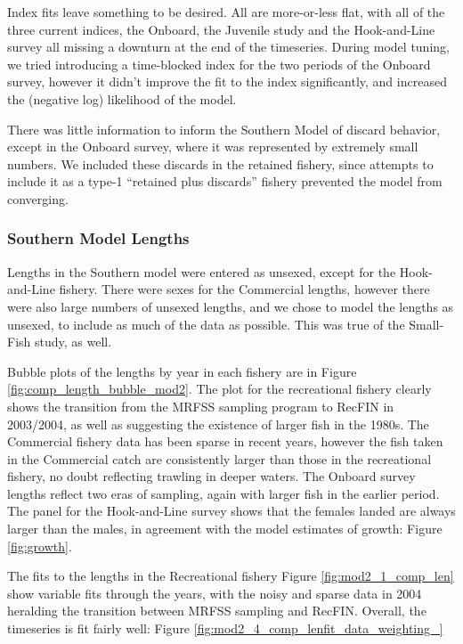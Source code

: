 \documentclass[12pt,]{article}
\begin{document}
Index fits leave something to be desired. All are more-or-less flat,
with all of the three current indices, the Onboard, the Juvenile study
and the Hook-and-Line survey all missing a downturn at the end of the
timeseries. During model tuning, we tried introducing a time-blocked
index for the two periods of the Onboard survey, however it didn't
improve the fit to the index significantly, and increased the (negative
log) likelihood of the model.

There was little information to inform the Southern Model of discard
behavior, except in the Onboard survey, where it was represented by
extremely small numbers. We included these discards in the retained
fishery, since attempts to include it as a type-1 ``retained plus
discards'' fishery prevented the model from converging.

\subsubsection{Southern Model Lengths}\label{southern-model-lengths}

Lengths in the Southern model were entered as unsexed, except for the
Hook-and-Line fishery. There were sexes for the Commercial lengths,
however there were also large numbers of unsexed lengths, and we chose
to model the lengths as unsexed, to include as much of the data as
possible. This was true of the Small-Fish study, as well.

Bubble plots of the lengths by year in each fishery are in Figure
\ref{fig:comp_length_bubble_mod2}. The plot for the recreational fishery
clearly shows the transition from the MRFSS sampling program to RecFIN
in 2003/2004, as well as suggesting the existence of larger fish in the
1980s. The Commercial fishery data has been sparse in recent years,
however the fish taken in the Commercial catch are consistently larger
than those in the recreational fishery, no doubt reflecting trawling in
deeper waters. The Onboard survey lengths reflect two eras of sampling,
again with larger fish in the earlier period. The panel for the
Hook-and-Line survey shows that the females landed are always larger
than the males, in agreement with the model estimates of growth: Figure
\ref{fig:growth}.

The fits to the lengths in the Recreational fishery Figure
\ref{fig:mod2_1_comp_len} show variable fits through the years, with the
noisy and sparse data in 2004 heralding the transition between MRFSS
sampling and RecFIN. Overall, the timeseries is fit fairly well: Figure
\ref{fig:mod2_4_comp_lenfit_data_weighting_}
\end{document}
